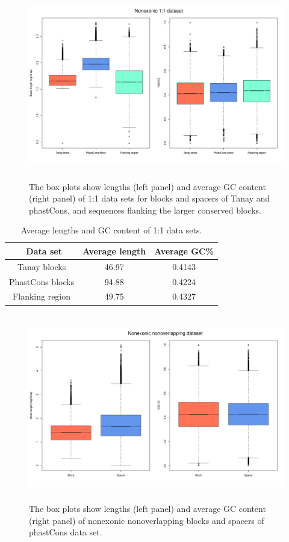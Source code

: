 \documentclass[12pt]{report}
\begin{document}
\begin{figure}[htbp]
\centering
\includegraphics[width=\textwidth, height=82mm]{nonexonic_1_1_GC_lengths}
\caption{The box plots show lengths (left panel) and average GC content (right panel) of 1:1 data sets for blocks and spacers of Tanay and phastCons, and sequences flanking the larger conserved blocks.}
\label{fig:1_1_base_comp}
\end{figure}

\begin{table}[ht]
\centering
\begin{tabular}{c c c}
\hline\hline
\ Data set & Average length & Average GC\% \\ [0.5ex]
\hline
Tanay blocks & 46.97 & 0.4143 \\
PhastCons blocks & 94.88 & 0.4224 \\
Flanking region & 49.75 & 0.4327 \\ [1ex] 
\hline
\end{tabular}
\caption[Caption for LOF]{\centering Average lengths and GC content of 1:1 data sets.}
\end{table}

\begin{figure}[htbp]
\centering
\includegraphics[width=\textwidth, height=82mm]{nonexonic_nonoverlapping_GC_lengths}
\caption{The box plots show lengths (left panel) and average GC content (right panel) of nonexonic nonoverlapping blocks and spacers of phastCons data set.}
\label{fig:nonexonic_nonoverlap_base_comp}
\end{figure}
\end{document}
